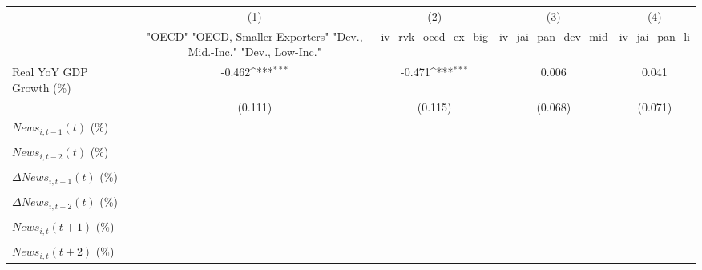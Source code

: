 {
\def\sym#1{\ifmmode^{#1}\else\(^{#1}\)\fi}
\begin{tabular}{l*{4}{c}}
\toprule
                    &\multicolumn{1}{c}{(1)}&\multicolumn{1}{c}{(2)}&\multicolumn{1}{c}{(3)}&\multicolumn{1}{c}{(4)}\\
                    &\multicolumn{1}{c}{ "OECD" "OECD, Smaller Exporters" "Dev., Mid.-Inc." "Dev., Low-Inc."}&\multicolumn{1}{c}{iv_rvk_oecd_ex_big}&\multicolumn{1}{c}{iv_jai_pan_dev_mid}&\multicolumn{1}{c}{iv_jai_pan_li}\\
\midrule
Real YoY GDP Growth (\%)&      -0.462\sym{***}&      -0.471\sym{***}&       0.006         &       0.041         \\
                    &     (0.111)         &     (0.115)         &     (0.068)         &     (0.071)         \\
\addlinespace
$ News_{i,t-1}(t)$ (\%)&                     &                     &                     &                     \\
                    &                     &                     &                     &                     \\
\addlinespace
$ News_{i,t-2}(t)$ (\%)&                     &                     &                     &                     \\
                    &                     &                     &                     &                     \\
\addlinespace
$ \Delta News_{i,t-1}(t)$ (\%)&                     &                     &                     &                     \\
                    &                     &                     &                     &                     \\
\addlinespace
$ \Delta News_{i,t-2}(t)$ (\%)&                     &                     &                     &                     \\
                    &                     &                     &                     &                     \\
\addlinespace
$ News_{i,t}(t+1)$ (\%)&                     &                     &                     &                     \\
                    &                     &                     &                     &                     \\
\addlinespace
$ News_{i,t}(t+2)$ (\%)&                     &                     &                     &                     \\

\end{tabular}}
